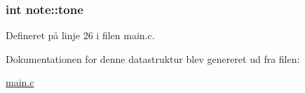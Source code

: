 \hypertarget{structnote_a30832d96c968d682e5838b39370a1908}{
\subsubsection[{tone}]{\setlength{\rightskip}{0pt plus 5cm}int note\+::tone}}\label{structnote_a30832d96c968d682e5838b39370a1908}


Defineret på linje 26 i filen main.\+c.



Dokumentationen for denne datastruktur blev genereret ud fra filen\+:\begin{DoxyCompactItemize}
\item 
\hyperlink{main_8c}{main.\+c}\end{DoxyCompactItemize}
